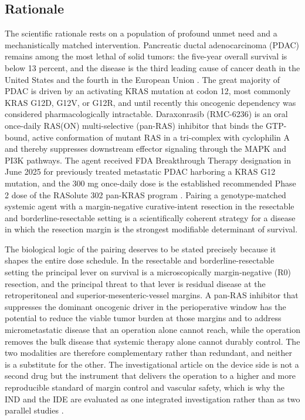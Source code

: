 \subsection{Rationale}

The scientific rationale rests on a population of profound unmet need and a
mechanistically matched intervention. Pancreatic ductal adenocarcinoma (PDAC)
remains among the most lethal of solid tumors: the five-year overall survival is
below 13 percent, and the disease is the third leading cause of cancer death in the
United States and the fourth in the European Union \cite{pdac060s2030}. The great
majority of PDAC is driven by an activating KRAS mutation at codon 12, most commonly
KRAS G12D, G12V, or G12R, and until recently this oncogenic dependency was
considered pharmacologically intractable. Daraxonrasib (RMC-6236) is an oral
once-daily RAS(ON) multi-selective (pan-RAS) inhibitor that binds the GTP-bound,
active conformation of mutant RAS in a tri-complex with cyclophilin A and thereby
suppresses downstream effector signaling through the MAPK and PI3K pathways. The
agent received FDA Breakthrough Therapy designation in June 2025 for previously
treated metastatic PDAC harboring a KRAS G12 mutation, and the 300 mg once-daily
dose is the established recommended Phase 2 dose of the RASolute 302 pan-KRAS
program \cite{daraxwhipple,oncotrialllm}. Pairing a genotype-matched systemic agent
with a margin-negative curative-intent resection in the resectable and
borderline-resectable setting is a scientifically coherent strategy for a disease in
which the resection margin is the strongest modifiable determinant of survival.

The biological logic of the pairing deserves to be stated precisely because it
shapes the entire dose schedule. In the resectable and borderline-resectable
setting the principal lever on survival is a microscopically margin-negative (R0)
resection, and the principal threat to that lever is residual disease at the
retroperitoneal and superior-mesenteric-vessel margins. A pan-RAS inhibitor that
suppresses the dominant oncogenic driver in the perioperative window has the
potential to reduce the viable tumor burden at those margins and to address
micrometastatic disease that an operation alone cannot reach, while the operation
removes the bulk disease that systemic therapy alone cannot durably control. The
two modalities are therefore complementary rather than redundant, and neither is a
substitute for the other. The investigational article on the device side is not a
second drug but the instrument that delivers the operation to a higher and more
reproducible standard of margin control and vascular safety, which is why the IND
and the IDE are evaluated as one integrated investigation rather than as two
parallel studies \cite{daraxwhipple,onpremwhippl}.

